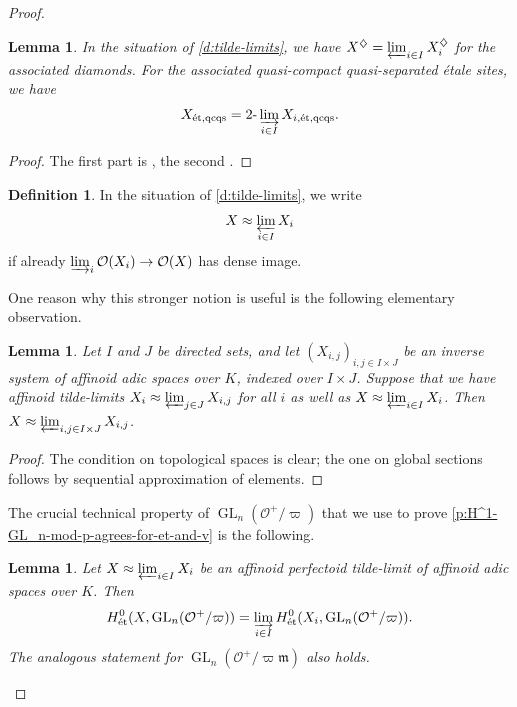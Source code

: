 \documentclass[11pt]{amsart}
\numberwithin{equation}{section}
\newtheorem{Lemma}[thm]{Lemma}
\theoremstyle{definition}
\newtheorem{Definition}[thm]{Definition}
\theoremstyle{remark}
\renewcommand{\O}{\mathcal{O}}
\newcommand{\m}{\mathfrak{m}}
\newcommand{\GL}{\operatorname{GL}}
\newcommand{\et}{{\operatorname{\acute{e}t}}}
\newcommand{\etqcqs}{{\operatorname{\acute{e}t,qcqs}}}
\begin{document}
\begin{proof}
        \begin{Lemma}\label{l:tilde-lim-2-lim-on-etqcqs}
		In the situation of \cref{d:tilde-limits}, we have $X^\diamondsuit=\varprojlim_{i\in I} X_i^\diamondsuit$ for the associated diamonds. For the associated quasi-compact quasi-separated \'etale sites, we have 
		\[ X_{\etqcqs}=2\text{-}\varinjlim_{i\in I}X_{i,\etqcqs}.\]
	\end{Lemma}
        
	\begin{proof}
		The first part is \cite[Proposition~2.4.5]{ScholzeWeinstein}, the second  \cite[Proposition~11.23]{etale-cohomology-of-diamonds}.
	\end{proof}

	\begin{Definition}\label{d:tilde-limit-approx-version}
		In the situation of \cref{d:tilde-limits}, we write 
		\[ X\approx \varprojlim_{i\in I} X_i\]
		if already $\varinjlim_{i}\O(X_i)\to \O(X)$ has dense image.
	\end{Definition}

        One reason why this stronger notion is useful is the following elementary observation. 

        \begin{Lemma}\label{l:pointwise-approximation}
		Let $I$ and $J$ be directed sets, and let $(X_{i,j})_{i,j\in I\times J}$ be an inverse system of affinoid adic spaces over $K$, indexed over $I\times J$. Suppose that we have affinoid tilde-limits $X_i\approx \varprojlim_{j\in J} X_{i,j}$ for all $i$ as well as $X\approx \varprojlim_{i\in I}X_i$. Then $X\approx\varprojlim_{i,j\in I\times J} X_{i,j}$.
	\end{Lemma}
        
	\begin{proof}
		The condition on topological spaces is clear; the one on global sections follows by sequential approximation of elements.
	\end{proof}

	The crucial technical property of $\GL_n(\O^+/\varpi)$ that we use to prove \cref{p:H^1-GL_n-mod-p-agrees-for-et-and-v} is the following. 

	\begin{Lemma}\label{p:GL_n(O^+/p^n)-in-proet-site}
		Let $X\approx \varprojlim_{i\in I} X_i$ be an affinoid perfectoid tilde-limit of affinoid adic spaces over $K$. Then
		\[ H^0_{\et}(X,\GL_n(\O^+/\varpi))=\varinjlim_{i\in I} H^0_{\et}(X_i,\GL_n(\O^+/\varpi)).\]
		The analogous statement for $\GL_n(\O^+/\varpi\m)$ also holds.
	\end{Lemma}


\end{proof}
\end{document}
